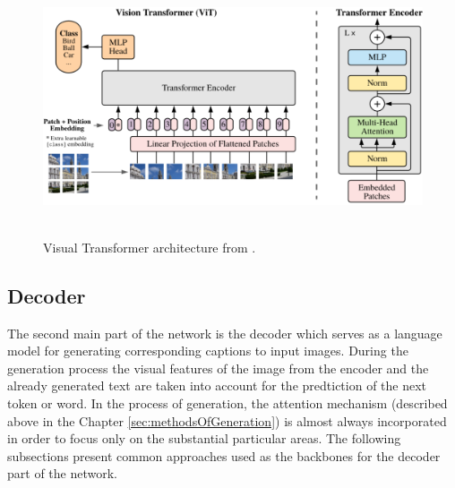 \begin{figure}[h]\centering
\includegraphics[width=145mm, height=76mm]{../img/VisualTransformerArchitecture}
\caption{Visual Transformer architecture from \citet{dosovitskiy2020image}.}
\label{fig02:ViT}
\end{figure}

\subsection{Decoder}
The second main part of the network is the decoder which serves as a language model for generating corresponding captions to input images. During the generation process the visual features of the image from the encoder and the already generated text are taken into account for the predtiction of the next token or word. In the process of generation, the attention mechanism (described above in the Chapter \ref{sec:methodsOfGeneration}) is almost always incorporated in order to focus only on the substantial particular areas. The following subsections present common approaches used as the backbones for the decoder part of the network.
